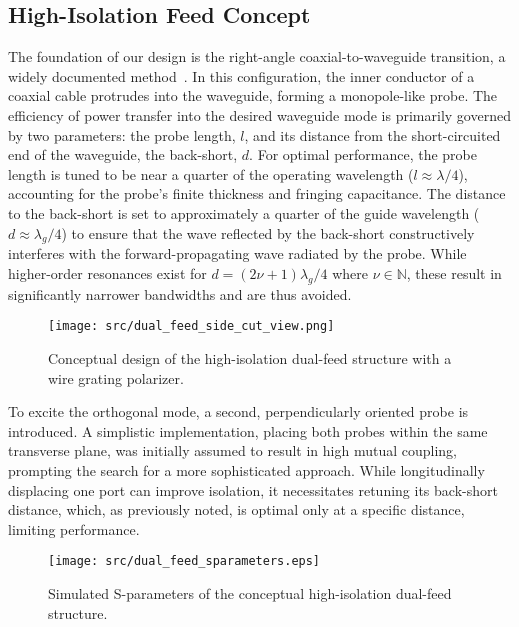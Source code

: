 \documentclass[journal,9pt]{IEEEtran}
\begin{document}
\subsection{High-Isolation Feed Concept}

The foundation of our design is the right-angle coaxial-to-waveguide transition, a widely documented method~\cite{fabregas-et-al:coaxial-to-rectangular-waveguide-transitions}. In this configuration, the inner conductor of a coaxial cable protrudes into the waveguide, forming a monopole-like probe. The efficiency of power transfer into the desired waveguide mode is primarily governed by two parameters: the probe length, $l$, and its distance from the short-circuited end of the waveguide, the back-short, $d$. For optimal performance, the probe length is tuned to be near a quarter of the operating wavelength ($l \approx \lambda/4$), accounting for the probe's finite thickness and fringing capacitance. The distance to the back-short is set to approximately a quarter of the guide wavelength ($d \approx \lambda_g/4$) to ensure that the wave reflected by the back-short constructively interferes with the forward-propagating wave radiated by the probe. While higher-order resonances exist for $d = (2\nu+1)\lambda_g/4$ where $\nu \in \mathbb{N}$, these result in significantly narrower bandwidths and are thus avoided.

\begin{figure}[!b]
    \centering
    \texttt{[image: src/dual\_feed\_side\_cut\_view.png]}
    \caption{\label{fig:dual-feed-conceptual}Conceptual design of the high-isolation dual-feed structure with a wire grating polarizer.}
\end{figure}

To excite the orthogonal mode, a second, perpendicularly oriented probe is introduced. A simplistic implementation, placing both probes within the same transverse plane, was initially assumed to result in high mutual coupling, prompting the search for a more sophisticated approach. While longitudinally displacing one port can improve isolation, it necessitates retuning its back-short distance, which, as previously noted, is optimal only at a specific distance, limiting performance.

\begin{figure}[!t]
    \centering
    \texttt{[image: src/dual\_feed\_sparameters.eps]}
    \caption{\label{fig:dual-feed-sparameters}Simulated S-parameters of the conceptual high-isolation dual-feed structure.}
\end{figure}
\end{document}
